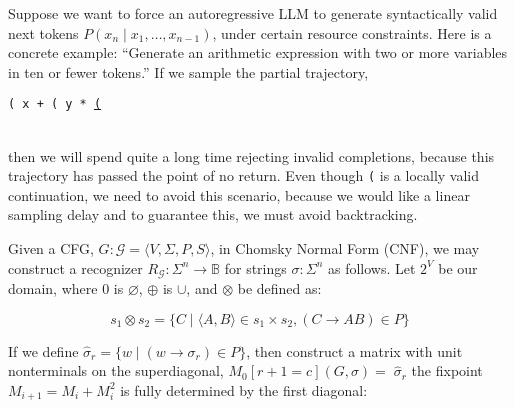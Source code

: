 \documentclass[portrait,a0b,final,a4resizeable]{a0poster}
\def\jointspacing{\vspace{0.3in}}
\begin{document}
\begin{poster}
\begin{multicols}{2}
\jointspacing

\null\hspace*{3cm}\begin{minipage}[c]{0.85\columnwidth}
Suppose we want to force an autoregressive LLM to generate syntactically valid next tokens $P(x_n \mid x_1, \ldots, x_{n-1})$, under certain resource constraints. Here is a concrete example: ``Generate an arithmetic expression with two or more variables in ten or fewer tokens.'' If we sample the partial trajectory,
\begin{center}\texttt{( x + ( y * }\underline{\texttt{(}}\end{center}\\
then we will spend quite a long time rejecting invalid completions, because this trajectory has passed the point of no return. Even though \texttt{(} is a locally valid continuation, we need to avoid this scenario, because we would like a linear sampling delay and to guarantee this, we must avoid backtracking.
\end{minipage}

      \jointspacing

      \null\hspace*{3cm}\begin{minipage}[c]{0.85\columnwidth}
          Given a CFG, $G: \mathcal{G} = \langle V, \Sigma, P, S\rangle$, in Chomsky Normal Form (CNF), we may construct a recognizer $R_\mathcal{G}: \Sigma^n \rightarrow \mathbb{B}$ for strings $\sigma: \Sigma^n$ as follows. Let $2^V$ be our domain, where $0$ is $\varnothing$, $\oplus$ is $\cup$, and $\otimes$ be defined as:\vspace{1cm}
      \end{minipage}

      \[
        s_1 \otimes s_2 = \{C \mid \langle A, B\rangle \in s_1 \times s_2, (C\rightarrow AB) \in P\}
      \]

      \null\hspace*{3cm}\begin{minipage}[c]{0.85\columnwidth}
If we define $\hat\sigma_r = \{w \mid (w \rightarrow \sigma_r) \in P\}$, then construct a matrix with unit nonterminals on the superdiagonal, $M_0[r+1=c](G, \sigma) = \;\hat\sigma_r$ the fixpoint $M_{i+1} = M_i + M_i^2$ is fully determined by the first diagonal:\vspace{0.5cm}
\end{minipage}


\end{multicols}
\end{poster}
\end{document}
